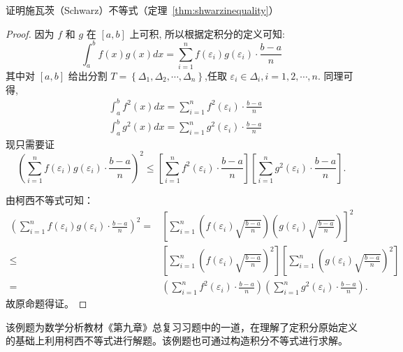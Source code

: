 \begin{example}
  \parencite{华东师大数学分析} 证明施瓦茨（Schwarz）不等式（定理~\ref{thm:shwarzinequality}）
\end{example}


\begin{proof}
  因为 $f$ 和 $g$ 在 $[a, b]$ 上可积, 所以根据定积分的定义可知:
  \[
  \int_{a}^{b} f(x) g(x) d x=\sum_{i=1}^{n} f\left(\varepsilon_{i}\right) g\left(\varepsilon_{i}\right) \cdot \frac{b-a}{n}
  \]
  其中对 $[a, b]$ 给出分割 $T=\left\{\Delta_{1}, \Delta_{2}, \cdots, \Delta_{n}\right\}$,任取 $\varepsilon_{i} \in \Delta_{i}, i=1,2, \cdots, n.$
  同理可得,
  \[
  \begin{aligned}
  &\int_{a}^{b} f^{2}(x) d x=\sum_{i=1}^{n} f^{2}\left(\varepsilon_{i}\right) \cdot \frac{b-a}{n} \\
  &\int_{a}^{b} g^{2}(x) d x=\sum_{i=1}^{n} g^{2}\left(\varepsilon_{i}\right) \cdot \frac{b-a}{n}
  \end{aligned}
  \]
  现只需要证 \[\left(\sum_{i=1}^{n} f\left(\varepsilon_{i}\right) g\left(\varepsilon_{i}\right) \cdot \frac{b-a}{n}\right)^{2} \leq\left[\sum_{i=1}^{n} f^{2}\left(\varepsilon_{i}\right) \cdot \frac{b-a}{n}\right]\left[\sum_{i=1}^{n} g^{2}\left(\varepsilon_{i}\right) \cdot \frac{b-a}{n}\right].\]

  由柯西不等式可知：
  \[
    \begin{aligned} 
    \left(\sum_{i=1}^{n} f\left(\varepsilon_{i}\right) g\left(\varepsilon_{i}\right) \cdot \frac{b-a}{n}\right)^{2}=&\left[\sum_{i=1}^{n}\left(f\left(\varepsilon_{i}\right) \sqrt{\frac{b-a}{n}}\right)\left(g\left(\varepsilon_{i}\right) \sqrt{\frac{b-a}{n}}\right)\right]^{2} \\ 
    \leq &\left[\sum_{i=1}^{n}\left(f\left(\varepsilon_{i}\right) \sqrt{\frac{b-a}{n}}\right)^{2}\right]\left[\sum_{i=1}^{n}\left(g\left(\varepsilon_{i}\right) \sqrt{\frac{b-a}{n}}\right)^{2}\right]\\
    =& {\left(\sum_{i=1}^{n} f^{2}\left(\varepsilon_{i}\right) \cdot \frac{b-a}{n}\right)\left(\sum_{i=1}^{n} g^{2}\left(\varepsilon_{i}\right) \cdot \frac{b-a}{n}\right) }.
  \end{aligned}\]
  故原命题得证。
\end{proof}


\begin{analysis}
  该例题为数学分析教材《第九章》总复习习题中的一道，在理解了定积分原始定义的基础上利用柯西不等式进行解题。该例题也可通过构造积分不等式进行求解。
\end{analysis}